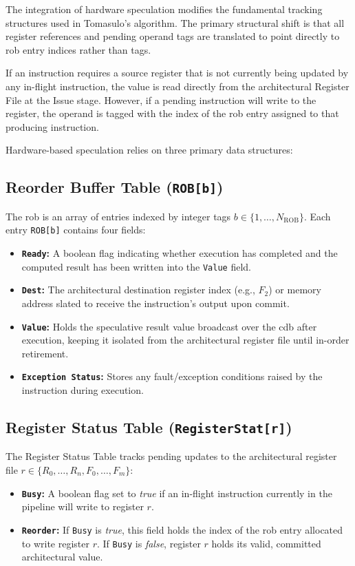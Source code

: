 The integration of hardware speculation modifies the fundamental tracking structures used in Tomasulo's algorithm. The primary structural shift is that all register references and pending operand tags are translated to point directly to \gls{rob} entry indices rather than  tags. 

If an instruction requires a source register that is not currently being updated by any in-flight instruction, the value is read directly from the architectural Register File at the Issue stage. However, if a pending instruction will write to the register, the operand is tagged with the index of the \gls{rob} entry assigned to that producing instruction.

Hardware-based speculation relies on three primary data structures:

\subsection{Reorder Buffer Table (\texttt{ROB[b]})}
The \gls{rob} is an array of entries indexed by integer tags $b \in \{1, \dots, N_{\text{ROB}}\}$. Each entry \texttt{ROB[b]} contains four fields:
\begin{itemize}
    \item \textbf{\texttt{Ready}:} A boolean flag indicating whether execution has completed and the computed result has been written into the \texttt{Value} field.
    \item \textbf{\texttt{Dest}:} The architectural destination register index (e.g., $F_2$) or memory address slated to receive the instruction's output upon commit.
    \item \textbf{\texttt{Value}:} Holds the speculative result value broadcast over the \gls{cdb} after execution, keeping it isolated from the architectural register file until in-order retirement.
    \item \textbf{\texttt{Exception Status}:} Stores any fault/exception conditions raised by the instruction during execution.
\end{itemize}

\subsection{Register Status Table (\texttt{RegisterStat[r]})}
The Register Status Table tracks pending updates to the architectural register file $r \in \{R_0, \dots, R_n, F_0, \dots, F_m\}$:
\begin{itemize}
    \item \textbf{\texttt{Busy}:} A boolean flag set to \textit{true} if an in-flight instruction currently in the pipeline will write to register $r$.
    \item \textbf{\texttt{Reorder}:} If \texttt{Busy} is \textit{true}, this field holds the index of the \gls{rob} entry allocated to write register $r$. If \texttt{Busy} is \textit{false}, register $r$ holds its valid, committed architectural value.
\end{itemize}

